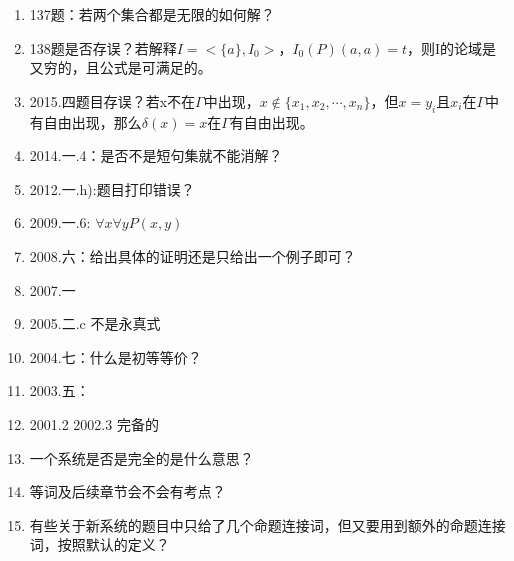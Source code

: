 \documentclass[a4paper]{ctexart}
\begin{document}
\begin{enumerate}
  \item 137题：若两个集合都是无限的如何解？
   
  \item 138题是否存误？若解释$I=<\{a\},I_0>$，$I_0(P)(a,a)=t$，则I的论域是又穷的，且公式是可满足的。
  
  
  \item 2015.四题目存误？若x不在$\Gamma$中出现，$x\not\in\{x_1,x_2,\cdots,x_n\}$，但$x=y_i$且$x_i$在$\Gamma$中有自由出现，那么$\delta(x)=x$在$\Gamma$有自由出现。
  
  \item 2014.一.4：是否不是短句集就不能消解？
  
  \item 2012.一.h):题目打印错误？
  
  \item 2009.一.6: $\forall{x}\forall{y}P(x,y)$
  
  \item 2008.六：给出具体的证明还是只给出一个例子即可？
    
  \item 2007.一
  
  \item 2005.二.c 不是永真式    
   
  
  \item 2004.七：什么是初等等价？
   
  
  \item 2003.五：
  
  \item 2001.2 2002.3 完备的
  
  \item 一个系统是否是完全的是什么意思？
  
  
  \item 等词及后续章节会不会有考点？
  
  \item 有些关于新系统的题目中只给了几个命题连接词，但又要用到额外的命题连接词，按照默认的定义？
  

\end{enumerate}
  
\end{document}
